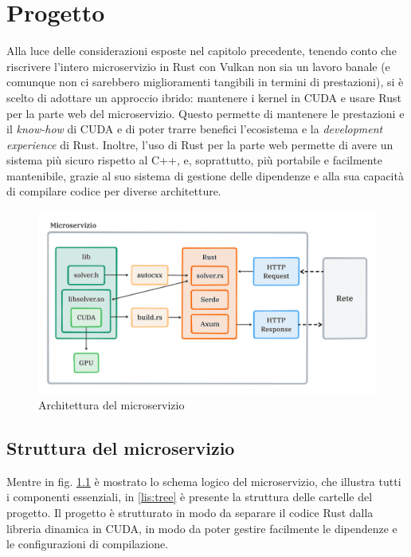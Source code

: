 \chapter{Progetto}
\label{sec:arch}

Alla luce delle considerazioni esposte nel capitolo precedente, tenendo conto che riscrivere l'intero microservizio in Rust con Vulkan non sia un lavoro banale (e comunque non ci sarebbero miglioramenti tangibili in termini di prestazioni), si è scelto di adottare un approccio ibrido: mantenere i kernel in \gls{CUDA} e usare Rust per la parte web del microservizio. Questo permette di mantenere le prestazioni e il \textit{know-how} di \gls{CUDA} e di poter trarre benefici l'ecosistema e la \textit{development experience} di Rust. Inoltre, l'uso di Rust per la parte web permette di avere un sistema più sicuro rispetto al C++, e, soprattutto, più portabile e facilmente mantenibile, grazie al suo sistema di gestione delle dipendenze e alla sua capacità di compilare codice per diverse architetture.

\begin{figure}[ht]
    \centering
    \includegraphics[width=.94\linewidth]{images/chapter6/micro_arch.png}
    \caption{Architettura del microservizio}
    \label{fig:micro_arch}
\end{figure}

\section{Struttura del microservizio}

Mentre in fig. \ref{fig:micro_arch} è mostrato lo schema logico del microservizio, che illustra tutti i componenti essenziali, in \ref{lis:tree} è presente la struttura delle cartelle del progetto. Il progetto è strutturato in modo da separare il codice Rust dalla libreria dinamica in \gls{CUDA}, in modo da poter gestire facilmente le dipendenze e le configurazioni di compilazione.

